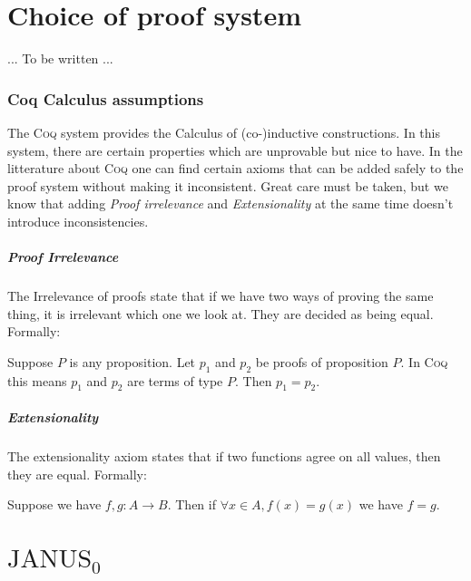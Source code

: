 \newcommand{\janusz}{$\mathrm{JANUS}_0$}
\newcommand{\coq}{\textsc{Coq}}
\newcommand{\NN}{\mathbb{N}}
\newcommand{\ZZ}{\mathbb{Z}}
\chapter{Choice of proof system}

... To be written ...

\subsection{Coq Calculus assumptions}

The \coq{} system provides the Calculus of (co-)inductive
constructions. In this system, there are certain properties which are
unprovable but nice to have. In the litterature about \coq{} one can
find certain axioms that can be added safely to the proof system
without making it inconsistent. Great care must be taken, but we know
that adding \emph{Proof irrelevance} and \emph{Extensionality} at the
same time doesn't introduce inconsistencies.

\paragraph{Proof Irrelevance}
\label{sec:proof-irrelevance}

The Irrelevance of proofs state that if we have two ways of proving
the same thing, it is irrelevant which one we look at. They are
decided as being equal. Formally:
\begin{axm}
  Suppose $P$ is any proposition. Let $p_1$ and $p_2$ be proofs of
  proposition $P$. In \coq{} this means $p_1$ and $p_2$ are terms of
  type $P$. Then $p_1 = p_2$.
\end{axm}

\paragraph{Extensionality}
\label{sec:extensionality}

The extensionality axiom states that if two functions agree on all
values, then they are equal. Formally:
\begin{axm}
  Suppose we have $f, g \colon A \to B$. Then if $\forall x \in A,
  f(x) = g(x)$ we have $f = g$.
\end{axm}

\chapter{\janusz{}}


